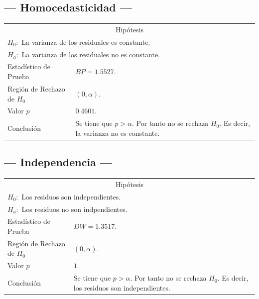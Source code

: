 \documentclass{article}
\begin{document}
\subsection{--- Homocedasticidad ---} %
\begin{center}
  \begin{tabular}{|l|p{8cm}|}
    \cline{1-2}
    \multicolumn{2}{|c|}{Hipótesis}\\ \cline{1-2}
    \multicolumn{2}{|l|}{\(H_0:\) La varianza de los residuales es constante.} \\ 
    \multicolumn{2}{|l|}{\(H_a:\) La varianza de los residuales no es constante.} \\ \cline{1-2}
    Estadístico de Prueba & \(BP = 1.5527\).\\ \cline{1-2} 
		Región de Rechazo de \(H_0\) & \((0, \alpha )\).\\ \cline{1-2} 
    Valor \(p\) & \(0.4601\).\\ \cline{1-2} 
    Conclusión & Se tiene que \(p> \alpha\). \newline 
		Por tanto no se rechaza \(H_0\). \newline 
		Es decir, la varianza no es constante. \\ \cline{1-2} 
  \end{tabular}
\end{center}

\subsection{--- Independencia ---} %
\begin{center}
  \begin{tabular}{|l|p{8cm}|}
    \cline{1-2}
    \multicolumn{2}{|c|}{Hipótesis}\\ \cline{1-2}
    \multicolumn{2}{|l|}{\(H_0:\) Los residuos son independientes.} \\ 
    \multicolumn{2}{|l|}{\(H_a:\) Los residuos no son indpendientes.} \\ \cline{1-2}
    Estadístico de Prueba & \(DW = 1.3517\).\\ \cline{1-2} 
		Región de Rechazo de \(H_0\) & \((0, \alpha )\).\\ \cline{1-2} 
    Valor \(p\) & \(1\).\\ \cline{1-2} 
    Conclusión & Se tiene que \(p> \alpha\). \newline 
		Por tanto no se rechaza \(H_0\). \newline 
		Es decir, los residuos son independientes.\\ \cline{1-2} 
  \end{tabular}
\end{center}
\end{document}
